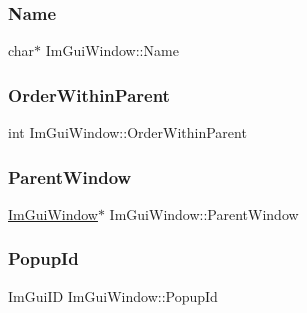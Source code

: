 \hypertarget{struct_im_gui_window_ab44252eb7d02d3f38249f5bac605037c}{}\label{struct_im_gui_window_ab44252eb7d02d3f38249f5bac605037c} 
\subsubsection{\texorpdfstring{Name}{Name}}
{\footnotesize\ttfamily char$\ast$ Im\+Gui\+Window\+::\+Name}

\hypertarget{struct_im_gui_window_a81cb24c35445e1259367284701253c79}{}\label{struct_im_gui_window_a81cb24c35445e1259367284701253c79} 
\subsubsection{\texorpdfstring{Order\+Within\+Parent}{OrderWithinParent}}
{\footnotesize\ttfamily int Im\+Gui\+Window\+::\+Order\+Within\+Parent}

\hypertarget{struct_im_gui_window_a5f0b37cb12fbeb3efe00d0cd826d5d65}{}\label{struct_im_gui_window_a5f0b37cb12fbeb3efe00d0cd826d5d65} 
\subsubsection{\texorpdfstring{Parent\+Window}{ParentWindow}}
{\footnotesize\ttfamily \hyperlink{struct_im_gui_window}{Im\+Gui\+Window}$\ast$ Im\+Gui\+Window\+::\+Parent\+Window}

\hypertarget{struct_im_gui_window_a319c5f43fa4ee9c76b8a6e551e0c0869}{}\label{struct_im_gui_window_a319c5f43fa4ee9c76b8a6e551e0c0869} 
\subsubsection{\texorpdfstring{Popup\+Id}{PopupId}}
{\footnotesize\ttfamily Im\+Gui\+ID Im\+Gui\+Window\+::\+Popup\+Id}

\hypertarget{struct_im_gui_window_a1453f685401a44f76256fb54a4aac451}{}\label{struct_im_gui_window_a1453f685401a44f76256fb54a4aac451} 
